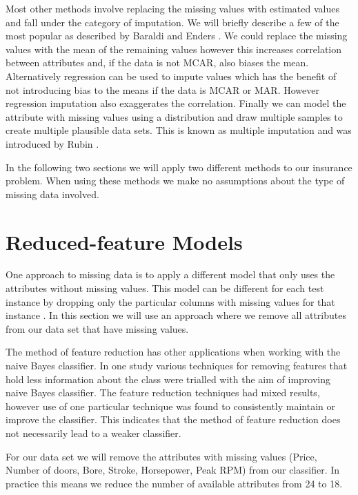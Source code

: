 Most other methods involve replacing the missing values with estimated values and fall under the category of imputation.
We will briefly describe a few of the most popular as described by Baraldi and Enders \cite{Baraldi09}.
We could replace the missing values with the mean of the remaining values however this increases correlation between attributes and, if the data is not MCAR, also biases the mean.
Alternatively regression can be used to impute values which has the benefit of not introducing bias to the means if the data is MCAR or MAR.
However regression imputation also exaggerates the correlation.
Finally we can model the attribute with missing values using a distribution and draw multiple samples to create multiple plausible data sets.
This is known as multiple imputation and was introduced by Rubin \cite{Rubin87}.

In the following two sections we will apply two different methods to our insurance problem.
When using these methods we make no assumptions about the type of missing data involved.

\section{Reduced-feature Models}

One approach to missing data is to apply a different model that only uses the attributes without missing values. This model can be different for each test instance by dropping only the particular columns with missing values for that instance \cite{Saar-Tsechansky07}.
In this section we will use an approach where we remove all attributes from our data set that have missing values.

The method of feature reduction has other applications when working with the naive Bayes classifier.
In one study \cite{Novakovic10} various techniques for removing features that hold less information about the class were trialled with the aim of improving naive Bayes classifier.
The feature reduction techniques had mixed results, however use of one particular technique was found to consistently maintain or improve the classifier.
This indicates that the method of feature reduction does not necessarily lead to a weaker classifier.

For our data set we will remove the attributes with missing values (Price, Number of doors, Bore, Stroke, Horsepower, Peak RPM) from our classifier.
In practice this means we reduce the number of available attributes from 24 to 18.

